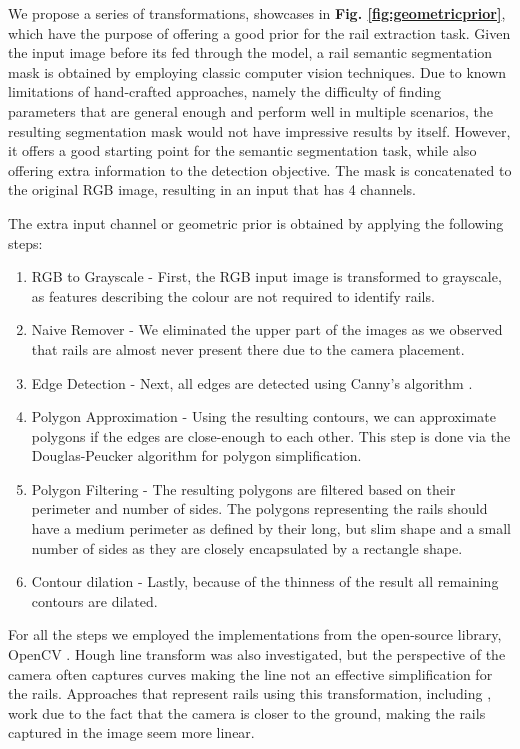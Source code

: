 \documentclass[conference]{IEEEtran}
\begin{document}
We propose a series of transformations, showcases in \textbf{Fig. \ref{fig:geometricprior}}, which have the purpose of offering a good prior for the rail extraction task. 
Given the input image before its fed through the model, a rail semantic segmentation mask is obtained by employing classic computer vision techniques. 
Due to known limitations of hand-crafted approaches, namely the difficulty of finding parameters that are general enough and perform well in multiple scenarios, the resulting segmentation mask would not have impressive results by itself. However, it offers a good starting point for the semantic segmentation task, while also offering extra information to the detection objective. The mask is concatenated to the original RGB image, resulting in an input that has 4 channels. 

The extra input channel or geometric prior is obtained by applying the following steps:
\begin{enumerate}
    \item RGB to Grayscale -  First, the RGB input image is transformed to grayscale, as features describing the colour are not required to identify rails.
    \item Naive Remover - We  eliminated the upper part of the images as we observed that rails are almost never present there due to the camera placement. 
    \item Edge Detection - Next, all edges are detected using Canny's algorithm \cite{canny1986computational}. 
    \item Polygon Approximation - Using the resulting contours, we can approximate polygons if the edges are close-enough to each other. This step is done via the Douglas-Peucker algorithm \cite{douglas1973algorithms} for polygon simplification. 
    \item Polygon Filtering - The resulting polygons are filtered based on their perimeter and number of sides. The polygons representing the rails should have a medium perimeter as defined by their long, but slim shape and a small number of sides as they are closely encapsulated by a rectangle shape. 
    \item Contour dilation - Lastly, because of the thinness of the result all remaining contours are dilated.
\end{enumerate}

For all the steps we employed the implementations from the open-source library, OpenCV \cite{opencv_library}. Hough line transform \cite{duda1972use} was also investigated, but the perspective of the camera often captures curves making the line not an effective simplification for the rails. Approaches that represent rails using this transformation, including \cite{karakose2016detection}, work due to the fact that the camera is closer to the ground, making the rails captured in the image seem more linear.
\end{document}
